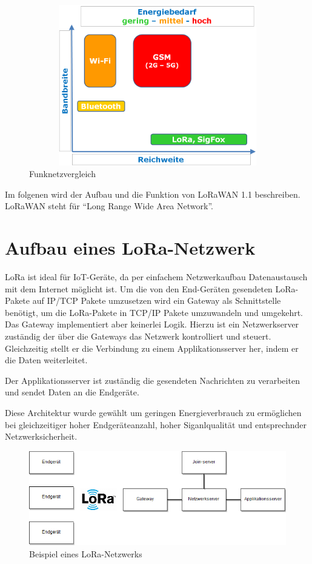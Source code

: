 \documentclass[a4paper, 12pt]{article}
\begin{document}
        \begin{figure}[ht]
            \centering
            \includegraphics[width=13cm, height=7cm]{Einfuehrung}
            \caption{Funknetzvergleich}
        \end{figure}

        Im folgenen wird der Aufbau und die Funktion von LoRaWAN 1.1 beschreiben.\newline
        LoRaWAN steht für ``Long Range Wide Area Network''. \cite{WhatIsLoRa}

        
        
    \section{Aufbau eines LoRa-Netzwerk}
        LoRa ist ideal für IoT-Geräte, da per einfachem Netzwerkaufbau Datenaustausch mit dem Internet möglicht ist.
        Um die von den End-Geräten gesendeten LoRa-Pakete auf IP/TCP Pakete umzusetzen wird ein Gateway als Schnittstelle
        benötigt, um die LoRa-Pakete in TCP/IP Pakete umzuwandeln und umgekehrt.
        Das Gateway implementiert aber keinerlei Logik. Hierzu ist ein Netzwerkserver zuständig der über die 
        Gateways das Netzwerk kontrolliert und steuert. Gleichzeitig stellt er die Verbindung zu einem 
        Applikationsserver her, indem er die Daten weiterleitet.

        Der Applikationsserver ist zuständig die gesendeten Nachrichten zu verarbeiten und sendet Daten an die 
        Endgeräte.

        Diese Architektur wurde gewählt um geringen Energieverbrauch zu ermöglichen bei gleichzeitiger 
        hoher Endgeräteanzahl, hoher Siganlqualität und entsprechnder Netzwerksicherheit. \cite[S. 8 ff.]{WhatIsLoRa}
        
        \begin{figure}[ht]
            \centering
            \includegraphics[width=\textwidth]{Netzwerkaufbau}
            \caption{Beispiel eines LoRa-Netzwerks}
        \end{figure}
\end{document}
